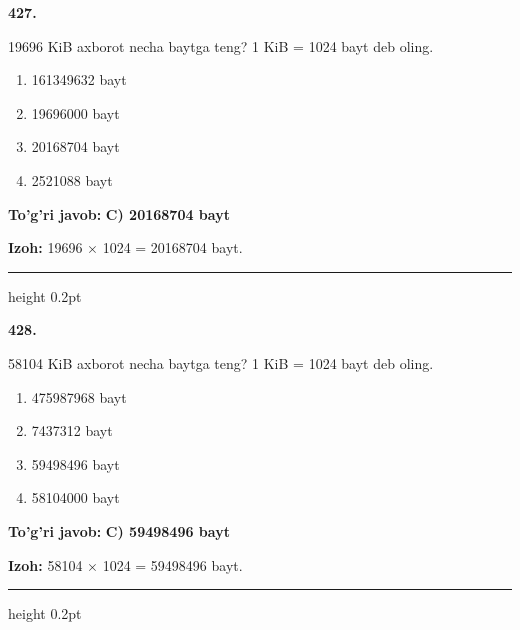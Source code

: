\documentclass[10pt,a4paper,oneside]{article}
\begin{document}
\noindent\textbf{\color{ink}427.}
\par
19696 KiB axborot necha baytga teng? 1 KiB = 1024 bayt deb oling.
\begin{enumerate}[label=\Alph*),leftmargin=9mm]
\item 161349632 bayt
\item 19696000 bayt
\item 20168704 bayt
\item 2521088 bayt
\end{enumerate}
\begin{tcolorbox}[enhanced,breakable,colback=teal!4,colframe=teal!50!black,boxrule=0.5pt,arc=1.1mm,left=3mm,right=3mm,top=1.7mm,bottom=1.7mm,before skip=2mm,after skip=2mm]
\textbf{\color{teal}To'g'ri javob:} \textbf{C) 20168704 bayt}
\par\smallskip
\textbf{Izoh:} 19696 \ensuremath{\times} 1024 = 20168704 bayt.
\end{tcolorbox}
\vspace{2mm}\hrule height 0.2pt \vspace{3mm}

\noindent\textbf{\color{ink}428.}
\par
58104 KiB axborot necha baytga teng? 1 KiB = 1024 bayt deb oling.
\begin{enumerate}[label=\Alph*),leftmargin=9mm]
\item 475987968 bayt
\item 7437312 bayt
\item 59498496 bayt
\item 58104000 bayt
\end{enumerate}
\begin{tcolorbox}[enhanced,breakable,colback=teal!4,colframe=teal!50!black,boxrule=0.5pt,arc=1.1mm,left=3mm,right=3mm,top=1.7mm,bottom=1.7mm,before skip=2mm,after skip=2mm]
\textbf{\color{teal}To'g'ri javob:} \textbf{C) 59498496 bayt}
\par\smallskip
\textbf{Izoh:} 58104 \ensuremath{\times} 1024 = 59498496 bayt.
\end{tcolorbox}
\vspace{2mm}\hrule height 0.2pt \vspace{3mm}
\end{document}
